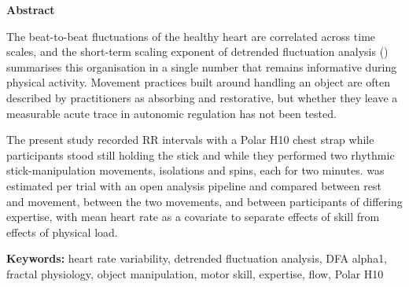 \begin{center}
{\large\bfseries Abstract}
\end{center}


The beat-to-beat fluctuations of the healthy heart are correlated across time scales, and the short-term scaling exponent of detrended fluctuation analysis (\aone) summarises this organisation in a single number that remains informative during physical activity. Movement practices built around handling an object are often described by practitioners as absorbing and restorative, but whether they leave a measurable acute trace in autonomic regulation has not been tested.

The present study recorded RR intervals with a Polar H10 chest strap while participants stood still holding the stick and while they performed two rhythmic stick-manipulation movements, isolations and spins, each for two minutes. \al{} was estimated per trial with an open analysis pipeline and compared between rest and movement, between the two movements, and between participants of differing expertise, with mean heart rate as a covariate to separate effects of skill from effects of physical load.



\textbf{Keywords:} heart rate variability, detrended fluctuation analysis, DFA alpha1, fractal physiology, object manipulation, motor skill, expertise, flow, Polar H10
